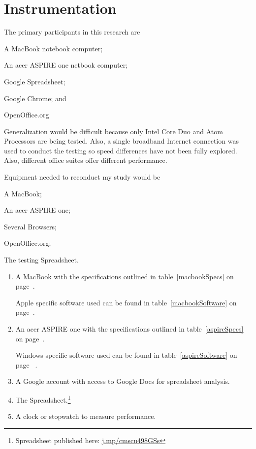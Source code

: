 \section{Instrumentation}


The primary participants in this research are 
\begin{inparaenum}[(1)]
\item A MacBook notebook computer;
\item An acer ASPIRE one netbook computer;
\item Google Spreadsheet;
\item Google Chrome; and
\item OpenOffice.org
\end{inparaenum}

Generalization would be difficult because only Intel Core Duo and Atom
Processors are being tested.  Also, a single broadband Internet connection was
used to conduct the testing so speed differences have not been fully explored.
Also, different office suites offer different performance.

Equipment needed to reconduct my study would be
\begin{inparaenum}[(1)]
\item A MacBook;
\item An acer ASPIRE one;
\item Several Browsers;
\item OpenOffice.org;
\item The testing Spreadsheet.
\end{inparaenum}

\begin{enumerate}

\item A MacBook with the specifications outlined in table~\ref{macbookSpecs} on page~\pageref{macbookSpecs}.

  Apple specific software used can be found in table~\ref{macbookSoftware} on page~\pageref{macbookSoftware}.

\item An acer ASPIRE one with the specifications outlined in table~\ref{aspireSpecs} on page~\pageref{aspireSpecs}.

  Windows specific software used can be found in table~\ref{aspireSoftware} on page ~\pageref{aspireSoftware}.


\item A Google account with access to Google Docs for spreadsheet analysis.

\item The Spreadsheet.\footnote{Spreadsheet published here:
  \url{j.mp/cmscu498GSs}}

\item A clock or stopwatch to measure performance.

\end{enumerate}

